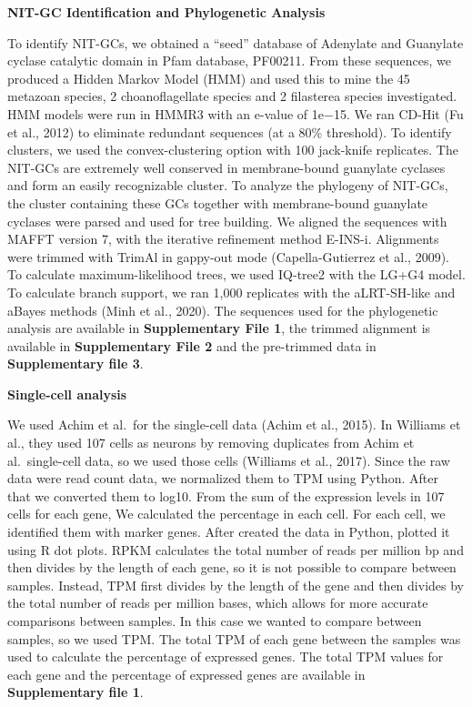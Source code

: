 \documentclass[
  10pt,
  onecolumn]{article}
\begin{document}
\textbf{NIT-GC Identification and Phylogenetic Analysis}

To identify NIT-GCs, we obtained a ``seed'' database of Adenylate and
Guanylate cyclase catalytic domain in Pfam database, PF00211. From these
sequences, we produced a Hidden Markov Model (HMM) and used this to mine
the 45 metazoan species, 2 choanoflagellate species and 2 filasterea
species investigated. HMM models were run in HMMR3 with an e-value of
1e−15. We ran CD-Hit (Fu et al., 2012) to eliminate redundant sequences
(at a 80\% threshold). To identify clusters, we used the
convex-clustering option with 100 jack-knife replicates. The NIT-GCs are
extremely well conserved in membrane-bound guanylate cyclases and form
an easily recognizable cluster. To analyze the phylogeny of NIT-GCs, the
cluster containing these GCs together with membrane-bound guanylate
cyclases were parsed and used for tree building. We aligned the
sequences with MAFFT version 7, with the iterative refinement method
E-INS-i. Alignments were trimmed with TrimAl in gappy-out mode
(Capella-Gutierrez et al., 2009). To calculate maximum-likelihood trees,
we used IQ-tree2 with the LG+G4 model. To calculate branch support, we
ran 1,000 replicates with the aLRT-SH-like and aBayes methods (Minh et
al., 2020). The sequences used for the phylogenetic analysis are
available in \textbf{Supplementary File 1}, the trimmed alignment is
available in \textbf{Supplementary File 2} and the pre-trimmed data in
\textbf{Supplementary file 3}.

\textbf{Single-cell analysis}

We used Achim et al.~for the single-cell data (Achim et al., 2015). In
Williams et al., they used 107 cells as neurons by removing duplicates
from Achim et al.~single-cell data, so we used those cells (Williams et
al., 2017). Since the raw data were read count data, we normalized them
to TPM using Python. After that we converted them to log10. From the sum
of the expression levels in 107 cells for each gene, We calculated the
percentage in each cell. For each cell, we identified them with marker
genes. After created the data in Python, plotted it using R dot plots.
RPKM calculates the total number of reads per million bp and then
divides by the length of each gene, so it is not possible to compare
between samples. Instead, TPM first divides by the length of the gene
and then divides by the total number of reads per million bases, which
allows for more accurate comparisons between samples. In this case we
wanted to compare between samples, so we used TPM. The total TPM of each
gene between the samples was used to calculate the percentage of
expressed genes. The total TPM values for each gene and the percentage
of expressed genes are available in \textbf{Supplementary file 1}.
\end{document}
